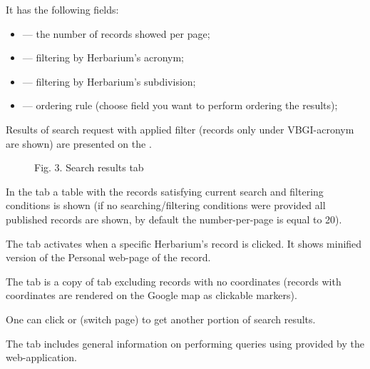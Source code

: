\documentclass[letterpaper,10pt,english]{sphinxmanual}
\begin{document}
It has the following fields:
\begin{itemize}
\item {} 
 —  the number of records showed per page;

\item {} 
 —  filtering by Herbarium’s acronym;

\item {} 
 —  filtering by Herbarium’s subdivision;

\item {} 
 —  ordering rule (choose field you want to perform ordering the results);

\end{itemize}

Results of search request with applied filter (records only under VBGI-acronym are shown) are presented
on the {\hyperref[\detokenize{search_basics:fig3}]{}}.

\begin{figure}[htbp]
\centering
\capstart

\noindent{}
\caption{Fig. 3. Search results tab}\label{\detokenize{search_basics:fig3}}\label{\detokenize{search_basics:id3}}\end{figure}

In the tab   a table with the records satisfying
current search and filtering conditions is shown
(if no searching/filtering
conditions were provided all published records are shown,
by default the number-per-page is equal to 20).

The  tab activates when a specific
Herbarium’s record is clicked. It shows
minified version of the Personal web-page of the record.

The  tab is a copy of  tab
excluding records with no coordinates (records with coordinates are rendered on the Google
map as clickable markers).

One can click  or  (switch page)
to get another portion of search results.

The  tab includes general information on
performing queries using
{\hyperref[\detokenize{http_api::doc}]{}} provided by the web-application.
\end{document}

